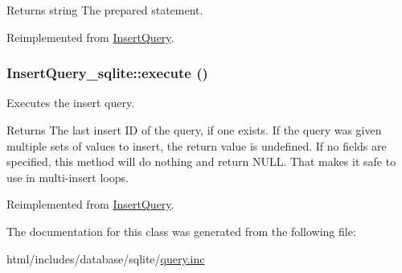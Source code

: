 \begin{DoxyReturn}{Returns}
string The prepared statement. 
\end{DoxyReturn}


Reimplemented from \hyperlink{classInsertQuery_a996fb0719632b8861284683c1ff711fa}{InsertQuery}.\hypertarget{classInsertQuery__sqlite_a95e8f7db8b3517715f222bf958e39ab9}{
\subsubsection[{execute}]{\setlength{\rightskip}{0pt plus 5cm}InsertQuery\_\-sqlite::execute ()}}
\label{classInsertQuery__sqlite_a95e8f7db8b3517715f222bf958e39ab9}
Executes the insert query.

\begin{DoxyReturn}{Returns}
The last insert ID of the query, if one exists. If the query was given multiple sets of values to insert, the return value is undefined. If no fields are specified, this method will do nothing and return NULL. That makes it safe to use in multi-\/insert loops. 
\end{DoxyReturn}


Reimplemented from \hyperlink{classInsertQuery_a9bcd2f989e2ae0173bd6f58b6ede12fc}{InsertQuery}.

The documentation for this class was generated from the following file:\begin{DoxyCompactItemize}
\item 
html/includes/database/sqlite/\hyperlink{sqlite_2query_8inc}{query.inc}\end{DoxyCompactItemize}
